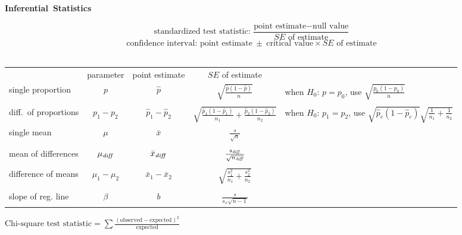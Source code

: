 \noindent%
\textbf{Inferential~Statistics} \vspace{2mm}

$$\text{standardized test statistic: }  \frac{\text{point estimate} - \text{null value}}{SE \text{ of estimate}}\qquad\ $$
$$\text{confidence interval: } \text{point estimate} \ \pm \ \text{critical value}\times SE \text{ of estimate}\qquad\ $$
\\[2mm]

\noindent%
\begin{tabular}{lcccl}
&parameter & point estimate &$SE$  of estimate& \\
single proportion &$p$ &$\hat{p}$ &$\sqrt{\frac{\hat{p}(1-\hat{p})}{n}}$ &
    {\footnotesize when $H_0$: $p=p_0$, use $\sqrt{\frac{p_0(1-p_0)}{n}}$} \\
\\
diff.~of proportions &
    $p_1-p_2$ & $\hat{p}_1-\hat{p}_2$ &
    $\sqrt{\frac{\hat{p}_1(1-\hat{p}_1)}{n_1}+
        \frac{\hat{p}_2(1-\hat{p}_2)}{n_2}}$ &
    {\footnotesize when $H_0$: $p_1=p_2$, use $\scriptscriptstyle{\sqrt{\hat{p}_c(1-\hat{p}_c)}\sqrt{\frac{1}{n_1}+\frac{1}{n_2}}}$}
    \\
single mean & $\mu$ & $\bar{x}$ & $\frac{s}{\sqrt{n}}$&\quad  \\
\\
mean of differences& $\mu_{\text{\emph{diff}}}$ & $\bar{x}_{\text{\emph{diff}}}$ & $\frac{s_{\text{\emph{diff}}}}{\sqrt{n_{\text{\emph{diff}}}}}$&\quad  \\
\\
difference of means & $\mu_1-\mu_2$ & $\bar{x}_1-\bar{x}_2$ & $\sqrt{\frac{s^2_1}{n_1}+\frac{s^2_2}{n_2}}$&\\
\\
slope of reg. line & $\beta$ & $b$ &  $\frac{s}{s_x\sqrt{n-1}}$
\end{tabular}
\vspace{1cm}

\noindent%
$\text{Chi-square test statistic} = \sum{\frac{(\text{observed} - \text{expected})^2}{\text{expected}}}$
\restoregeometry
